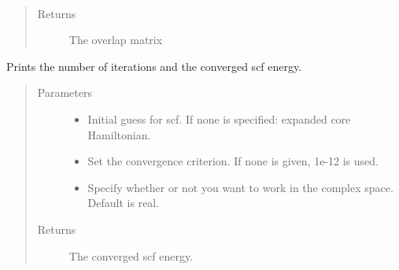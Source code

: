 \documentclass[letterpaper,10pt,english]{sphinxmanual}
\begin{document}
\begin{fulllineitems}
\begin{fulllineitems}
\label{\detokenize{GHF:hf.GHF.GHF.get_ovlp}}~\begin{quote}\begin{description}
\item[{Returns}] \leavevmode
The overlap matrix

\end{description}\end{quote}

\end{fulllineitems}


\begin{fulllineitems}
\label{\detokenize{GHF:hf.GHF.GHF.get_scf_solution}}
Prints the number of iterations and the converged scf energy.
\begin{quote}\begin{description}
\item[{Parameters}] \leavevmode\begin{itemize}
\item {} 
 \textendash{} Initial guess for scf. If none is specified: expanded core Hamiltonian.

\item {} 
 \textendash{} Set the convergence criterion. If none is given, 1e-12 is used.

\item {} 
 \textendash{} Specify whether or not you want to work in the complex space. Default is real.

\end{itemize}

\item[{Returns}] \leavevmode
The converged scf energy.

\end{description}\end{quote}

\end{fulllineitems}



\end{fulllineitems}
\end{document}
